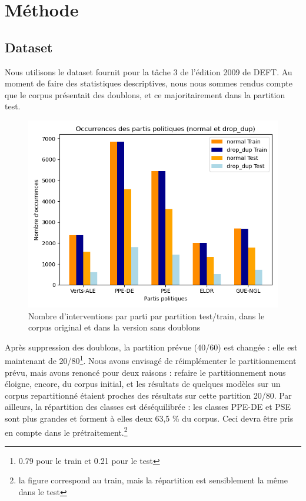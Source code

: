 \section{Méthode}

\subsection{Dataset}

Nous utilisons le dataset fournit pour la tâche 3 de l’édition 2009 de DEFT.
Au moment de faire des statistiques descriptives, nous nous sommes rendus compte 
que le corpus présentait des doublons, et ce majoritairement dans la partition test.
\begin{figure}[ht]
    \centering
    \includegraphics[width=\columnwidth]{../stats/occurences_orig_vs_drop_dup_par_cat.png}
    \caption{Nombre d'interventions par parti par partition test/train, dans le corpus original et dans la version sans doublons}
    \label{fig:barplot_dataset}
\end{figure}

Après suppression des doublons, la partition prévue (40/60) est changée : elle est 
maintenant de 20/80\footnote{ 0.79 pour le train et 0.21 pour le test}.
Nous avons envisagé de réimplémenter le partitionnement prévu, mais avons renoncé pour deux raisons : 
refaire le partitionnement nous éloigne, encore, du corpus initial, et les 
résultats de quelques modèles sur un corpus repartitionné étaient proches des résultats 
sur cette partition 20/80.
Par ailleurs, la répartition des classes est déséquilibrée : les classes PPE-DE et PSE sont plus grandes et forment à elles deux 63,5 \% du corpus. Ceci devra être 
pris en compte dans le prétraitement.\footnote{la figure correspond au train, mais la répartition est sensiblement la même dans le test}


